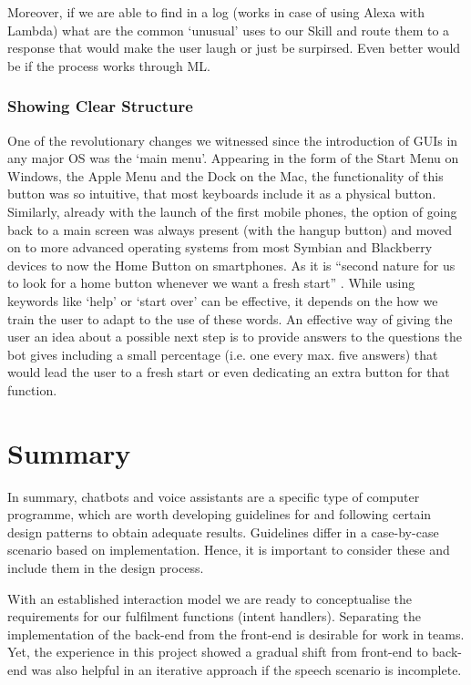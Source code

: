Moreover, if we are able to find in a log (works in case of using Alexa with Lambda) what are the common `unusual' uses to our Skill and route them to a response that would make the user laugh or just be surpirsed. Even better would be if the process works through ML.


\subsubsection*{Showing Clear Structure}
One of the revolutionary changes we witnessed since the introduction of GUIs in any major OS was the `main menu'. Appearing in the form of the Start Menu on Windows, the Apple Menu and the Dock on the Mac, the functionality of this button was so intuitive, that most keyboards include it as a physical button. Similarly, already with the launch of the first mobile phones, the option of going back to a main screen was always present (with the hangup button) and moved on to more advanced operating systems from most Symbian and Blackberry devices to now the Home Button on smartphones. As it is ``second nature for us to look for a home button whenever we want a fresh start'' \cite{uxbot}. While using keywords like `help' or `start over' can be effective, it depends on the how we train the user to adapt to the use of these words.
An effective way of giving the user an idea about a possible next step is to provide answers to the questions the bot gives including a small percentage (i.e. one every max. five answers) that would lead the user to a fresh start or even dedicating an extra button for that function.
\\

\section{Summary}
In summary, chatbots and voice assistants are a specific type of computer programme, which are worth developing guidelines for and following certain design patterns to obtain adequate results. Guidelines differ in a case-by-case scenario based on implementation. Hence, it is important to consider these and include them in the design process.

With an established interaction model we are ready to conceptualise the requirements for our fulfilment functions (intent handlers). 
Separating the implementation of the back-end from the front-end is desirable for work in teams. Yet, the experience in this project showed a gradual shift from front-end to back-end was also helpful in an iterative approach if the speech scenario is incomplete.
